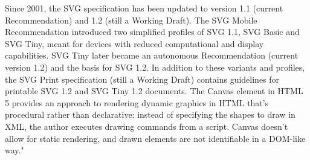 Since 2001, the SVG specification has been updated to version 1.1 (current Recommendation) and 1.2 (still a Working Draft). The SVG Mobile Recommendation introduced two simplified profiles of SVG 1.1, SVG Basic and SVG Tiny, meant for devices with reduced computational and display capabilities. SVG Tiny later became an autonomous Recommendation (current version 1.2) and the basis for SVG 1.2. In addition to these variants and profiles, the SVG Print specification (still a Working Draft) contains guidelines for printable SVG 1.2 and SVG Tiny 1.2 documents.
The Canvas element in HTML 5 provides an approach to rendering dynamic graphics in HTML that's procedural rather than declarative: instead of specifying the shapes to draw in XML, the author executes drawing commands from a script. Canvas doesn't allow for static rendering, and drawn elements are not identifiable in a DOM-like way."~\cite{SVG}
